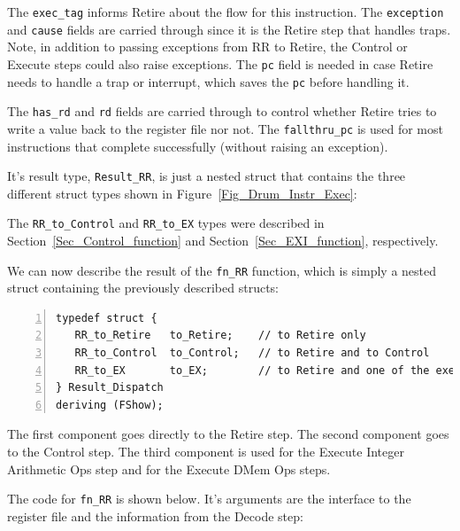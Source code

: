 The \verb|exec_tag| informs Retire about the flow for this
instruction.  The {\tt exception} and {\tt cause} fields are carried
through since it is the Retire step that handles traps.  Note, in
addition to passing exceptions from RR to Retire, the Control or
Execute steps could also raise exceptions.  The {\tt pc} field is
needed in case Retire needs to handle a trap or interrupt, which saves
the {\tt pc} before handling it.

The \verb|has_rd| and \verb|rd| fields are carried through to control
whether Retire tries to write a value back to the register file nor
not.  The \verb|fallthru_pc| is used for most instructions that
complete successfully (without raising an exception).

It's result type, \verb|Result_RR|, is just a nested struct that
contains the three different struct types shown in
Figure~\ref{Fig_Drum_Instr_Exec}:

The \verb|RR_to_Control| and \verb|RR_to_EX| types were described in
Section~\ref{Sec_Control_function} and Section~\ref{Sec_EXI_function},
respectively.

We can now describe the result of the \verb|fn_RR| function, which is
simply a nested struct containing the previously described structs:

{\small
\begin{Verbatim}[frame=single, numbers=left]
typedef struct {
   RR_to_Retire   to_Retire;    // to Retire only
   RR_to_Control  to_Control;   // to Retire and to Control
   RR_to_EX       to_EX;        // to Retire and one of the execute pipes
} Result_Dispatch
deriving (FShow);
\end{Verbatim}
}

The first component goes directly to the Retire step.  The second
component goes to the Control step.  The third component is used for
the Execute Integer Arithmetic Ops step and for the Execute DMem Ops
steps.

The code for \verb|fn_RR| is shown below.  It's arguments are the
interface to the register file and the information from the Decode
step:

